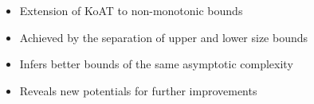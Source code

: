 \begin{itemize}[<+->]
\item Extension of KoAT to non-monotonic bounds
\item Achieved by the separation of upper and lower size bounds
\item Infers better bounds of the same asymptotic complexity
\item Reveals new potentials for further improvements
\end{itemize}
